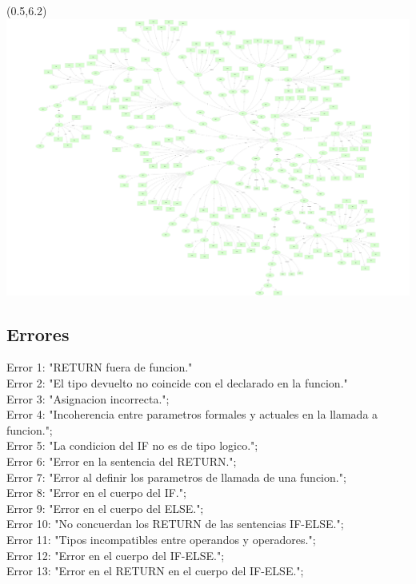 \documentclass[a4paper, 12pt]{article}
\begin{document}
\begin{textblock}{1}(0.5,6.2)
\centering
\includegraphics[width=20cm]{Enrico.pdf}
\end{textblock}
\vspace{15cm}
\subsection{Errores}

\indent Error 1: "RETURN fuera de funcion."\\
\indent Error 2: "El tipo devuelto no coincide con el declarado en la funcion."\\
\indent Error 3: "Asignacion incorrecta.";\\
\indent Error 4: "Incoherencia entre parametros formales y actuales en la llamada a funcion.";\\
\indent Error 5: "La condicion del IF no es de tipo logico.";\\
\indent Error 6: "Error en la sentencia del RETURN.";\\
\indent Error 7: "Error al definir los parametros de llamada de una funcion.";\\
\indent Error 8: "Error en el cuerpo del IF.";\\
\indent Error 9: "Error en el cuerpo del ELSE.";\\
\indent Error 10: "No concuerdan los RETURN de las sentencias IF-ELSE.";\\
\indent Error 11: "Tipos incompatibles entre operandos y operadores.";\\
\indent Error 12: "Error en el cuerpo del IF-ELSE.";\\
\indent Error 13: "Error en el RETURN en el cuerpo del IF-ELSE.";\\
\end{document}
